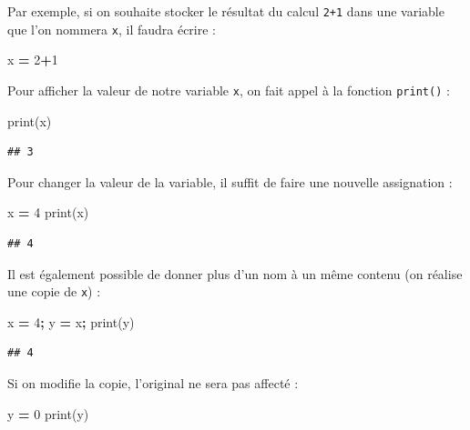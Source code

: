 \documentclass[12pt,]{book}
\newenvironment{Shaded}{\begin{snugshade}}{\end{snugshade}}
\newcommand{\DecValTok}[1]{\textcolor[rgb]{0.00,0.00,0.81}{#1}}
\newcommand{\OperatorTok}[1]{\textcolor[rgb]{0.81,0.36,0.00}{\textbf{#1}}}
\newcommand{\BuiltInTok}[1]{#1}
\newcommand{\NormalTok}[1]{#1}
\numberwithin{equation}{section}
\numberwithin{countremarque}{section}
\begin{document}
Par exemple, si on souhaite stocker le résultat du calcul \texttt{2+1}
dans une variable que l'on nommera \texttt{x}, il faudra écrire :

\begin{Shaded}
\begin{Highlighting}[]
\NormalTok{x }\OperatorTok{=} \DecValTok{2}\OperatorTok{+}\DecValTok{1}
\end{Highlighting}
\end{Shaded}

Pour afficher la valeur de notre variable \texttt{x}, on fait appel à la
fonction \texttt{print()} :

\begin{Shaded}
\begin{Highlighting}[]
\BuiltInTok{print}\NormalTok{(x)}
\end{Highlighting}
\end{Shaded}

\begin{lstlisting}
## 3
\end{lstlisting}

Pour changer la valeur de la variable, il suffit de faire une nouvelle
assignation :

\begin{Shaded}
\begin{Highlighting}[]
\NormalTok{x }\OperatorTok{=} \DecValTok{4}
\BuiltInTok{print}\NormalTok{(x)}
\end{Highlighting}
\end{Shaded}

\begin{lstlisting}
## 4
\end{lstlisting}

Il est également possible de donner plus d'un nom à un même contenu (on
réalise une copie de \texttt{x}) :

\begin{Shaded}
\begin{Highlighting}[]
\NormalTok{x }\OperatorTok{=} \DecValTok{4}\OperatorTok{;}
\NormalTok{y }\OperatorTok{=}\NormalTok{ x}\OperatorTok{;}
\BuiltInTok{print}\NormalTok{(y)}
\end{Highlighting}
\end{Shaded}

\begin{lstlisting}
## 4
\end{lstlisting}

Si on modifie la copie, l'original ne sera pas affecté :

\begin{Shaded}
\begin{Highlighting}[]
\NormalTok{y }\OperatorTok{=} \DecValTok{0}
\BuiltInTok{print}\NormalTok{(y)}
\end{Highlighting}
\end{Shaded}
\end{document}
